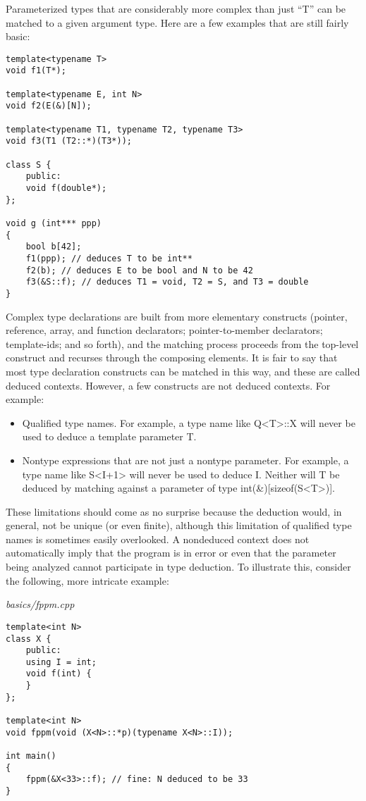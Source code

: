Parameterized types that are considerably more complex than just “T” can be matched to a given argument type. Here are a few examples that are still fairly basic:

\begin{lstlisting}[style=styleCXX]
template<typename T>
void f1(T*);

template<typename E, int N>
void f2(E(&)[N]);

template<typename T1, typename T2, typename T3>
void f3(T1 (T2::*)(T3*));

class S {
	public:
	void f(double*);
};

void g (int*** ppp)
{
	bool b[42];
	f1(ppp); // deduces T to be int**
	f2(b); // deduces E to be bool and N to be 42
	f3(&S::f); // deduces T1 = void, T2 = S, and T3 = double
}
\end{lstlisting} 

Complex type declarations are built from more elementary constructs (pointer, reference, array, and function declarators; pointer-to-member declarators; template-ids; and so forth), and the matching process proceeds from the top-level construct and recurses through the composing elements. It is fair to say that most type declaration constructs can be matched in this way, and these are called deduced contexts. However, a few constructs are not deduced contexts. For example:

\begin{itemize}
\item 
Qualified type names. For example, a type name like Q<T>::X will never be used to deduce a template parameter T.

\item 
Nontype expressions that are not just a nontype parameter. For example, a type name like S<I+1> will never be used to deduce I. Neither will T be deduced by matching against a parameter of type int(\&)[sizeof(S<T>)].
\end{itemize}

These limitations should come as no surprise because the deduction would, in general, not be unique (or even finite), although this limitation of qualified type names is sometimes easily overlooked. A nondeduced context does not automatically imply that the program is in error or even that the parameter being analyzed cannot participate in type deduction. To illustrate this, consider the following, more intricate example:

\noindent
\textit{basics/fppm.cpp}
\begin{lstlisting}[style=styleCXX]
template<int N>
class X {
	public:
	using I = int;
	void f(int) {
	}
};

template<int N>
void fppm(void (X<N>::*p)(typename X<N>::I));

int main()
{
	fppm(&X<33>::f); // fine: N deduced to be 33
}
\end{lstlisting}

